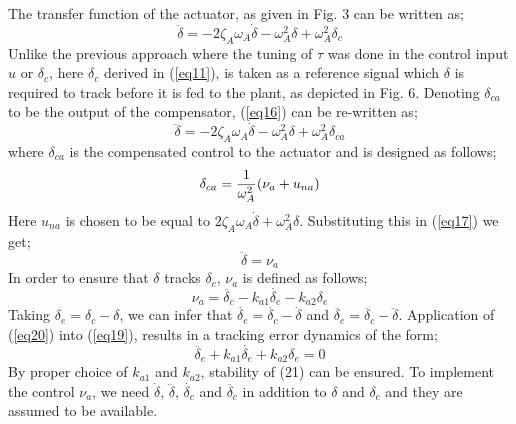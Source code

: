 \documentclass[conference]{IEEEtran}
\begin{document}
The transfer function of the actuator, as given in Fig. 3 can be written as;
%
\begin{equation}
\ddot{\delta}=-2\zeta_A\omega_A\dot{\delta}-\omega_A^2\delta+\omega_A^2\delta_c
\label{eq16}
\end{equation}
%
Unlike the previous approach where the tuning of $\tau$ was done in the control input $u$ or $\delta_c$, here $\delta_c$ derived in (\ref{eq11}), is taken as a reference signal which $\delta$ is required to track before it is fed to the plant, as depicted in Fig. 6. 
Denoting $\delta_{ca}$ to be the output of the compensator, (\ref{eq16}) can be re-written as;
%
\begin{equation}
\ddot{\delta}=-2\zeta_A\omega_A\dot{\delta}-\omega_A^2\delta+\omega_A^2\delta_{ca}
\label{eq17}
\end{equation}
%
where $\delta_{ca}$ is the compensated control to the actuator and is designed as follows;
%
\begin{equation}
\delta_{ca}={{1}\over{\omega^2_A}}(\nu_a+u_{na})
\label{eq18}
\end{equation}
%
Here $u_{na}$ is chosen to be equal to $2\zeta_A\omega_A\dot{\delta}+\omega_A^2\delta$. Substituting this in (\ref{eq17}) we get;
%
\begin{equation}
\ddot{\delta}=\nu_a
\label{eq19}
\end{equation}
%
In order to ensure that $\delta$ tracks $\delta_c$, $\nu_a$ is defined as follows;
%
\begin{equation}
\nu_a=\ddot{\delta_c}  -  k_{a1}\dot{\delta_e} - k_{a2}\delta_e
\label{eq20}
\end{equation}
%
Taking $\delta_e=\delta_c-\delta$, we can infer that $\dot{\delta_e}=\dot{\delta_c}-\dot{\delta}$ and $\ddot{\delta_e}=\ddot{\delta_c}-\ddot{\delta}$. Application of (\ref{eq20}) into (\ref{eq19}), results in a tracking error dynamics of the form;
%
\begin{equation}
\ddot{\delta_e}  +  k_{a1}\dot{\delta_e} + k_{a2}\delta_e=0
\label{eq21}
\end{equation}
%
By proper choice of $k_{a1}$ and $k_{a2}$, stability of (21) can be ensured. To implement the control $\nu_a$, we need $\dot{\delta}$, $\ddot{\delta}$, $\dot{\delta_c}$ and $\ddot{\delta_c}$ in addition to $\delta$ and $\delta_c$ and they are assumed to be available.
%
\end{document}
